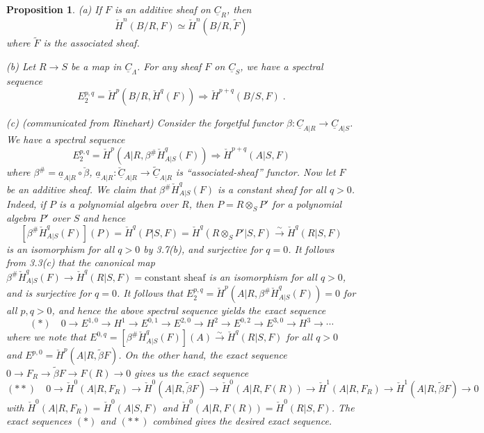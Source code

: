 \documentclass[11pt]{article}
\theoremstyle{plain}
\newtheorem{proposition}[theorem]{Proposition}
\theoremstyle{definition}
\theoremstyle{remark}
\begin{document}
\begin{proposition}
\textup{(a)} If $F$ is an additive sheaf on $\underline{C}_{R}$, then
\[
\check{H}^n(B/R, F) \simeq \check{H}^n(B/R, \widetilde{F})
\]
where $\widetilde{F}$ is the associated sheaf.

\textup{(b)} Let $R \to S$ be a map in $\underline{C}_{\Lambda}$. For any sheaf $F$ on $\underline{C}_{S}$, we have a spectral sequence
\[
E_2^{p,q} = \check{H}^p(B/R, \check{H}^q(F)) \Longrightarrow \check{H}^{p+q}(B/S, F)\;.
\]

\textup{(c)} (communicated from Rinehart) Consider the forgetful functor $\beta : \underline{C}_{A|R} \to \underline{C}_{A|S}$. We have a spectral sequence
\[
E_2^{p,q} = \check{H}^p(A|R, \beta^{\#}\check{H}^q_{A|S}(F)) \Longrightarrow \check{H}^{p+q}(A|S, F)
\]
where $\beta^{\#} = \underline{a}_{A|R} \circ \breve{\beta}$, $\underline{a}_{A|R} : \breve{\underline{C}}_{A|R} \to \widetilde{\underline{C}}_{A|R}$ is ``associated-sheaf'' functor. Now let $F$ be an additive sheaf. We claim that $\beta^{\#}\check{H}^q_{A|S}(F)$ is a constant sheaf for all $q > 0$. Indeed, if $P$ is a polynomial algebra over $R$, then $P = R \otimes_S P'$ for a polynomial algebra $P'$ over $S$ and hence
\[
[\beta^{\#}\check{H}^q_{A|S}(F)](P) = \check{H}^q(P|S, F) = \check{H}^q(R \otimes_S P'|S, F) \xrightarrow{\sim} \check{H}^q(R|S, F)
\]
is an isomorphism for all $q > 0$ by 3.7(b), and surjective for $q = 0$. It follows from 3.3(c) that the canonical map $\beta^{\#}\check{H}^q_{A|S}(F) \to \check{H}^q(R|S, F) = \text{constant sheaf}$ is an isomorphism for all $q > 0$, and is surjective for $q = 0$. It follows that $E_2^{p,q} = \check{H}^p(A|R, \beta^{\#}\check{H}^q_{A|S}(F)) = 0$ for all $p, q > 0$, and hence the above spectral sequence yields the exact sequence
\[
(*) \quad 0 \to E^{1,0} \to H^1 \to E^{0,1} \to E^{2,0} \to H^2 \to E^{0,2} \to E^{3,0} \to H^3 \to \cdots
\]
where we note that $E^{0,q} = [\beta^{\#}\check{H}^q_{A|S}(F)](A) \xrightarrow{\sim} \check{H}^q(R|S, F)$ for all $q > 0$ and $E^{p,0} = \check{H}^p(A|R, \widetilde{\beta}F)$. On the other hand, the exact sequence $0 \to F_R \to \widetilde{\beta}F \to F(R) \to 0$ gives us the exact sequence
\[
(**) \quad 0 \to \check{H}^0(A|R, F_R) \to \check{H}^0(A|R, \widetilde{\beta}F) \to \check{H}^0(A|R, F(R)) \to \check{H}^1(A|R, F_R) \to \check{H}^1(A|R, \widetilde{\beta}F) \to 0
\]
with $\check{H}^0(A|R, F_R) = \check{H}^0(A|S, F)$ and $\check{H}^0(A|R, F(R)) = \check{H}^0(R|S, F)$. The exact sequences $(*)$ and $(**)$ combined gives the desired exact sequence.
\end{proposition}
\end{document}
